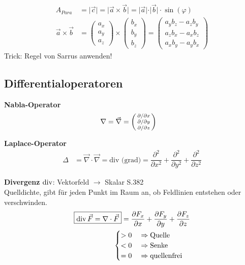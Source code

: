 \begingroup
\renewcommand*{\arraystretch}{.95}
\begin{align*}
	A_{Para} & = \vert \vec{c} \vert = \vert \vec{a} \times \vec{b} \vert = \vert \vec{a} \vert \cdot \vert \vec{b} \vert \cdot \sin(\varphi)\\
	\vec{a}\times\vec{b} & =
	\begin{pmatrix}
		a_x \\
		a_y \\
		a_z
	\end{pmatrix}
	\times
	\begin{pmatrix}
		b_x \\
		b_y \\
		b_z
	\end{pmatrix} =
	\begin{pmatrix}
		a_yb_z-a_zb_y \\
		a_zb_x-a_xb_z \\
		a_xb_y-a_yb_x
	\end{pmatrix}
\end{align*}
\endgroup
Trick: Regel von Sarrus anwenden!

\subsection{Differentialoperatoren}
\textbf{Nabla-Operator}
\begin{align*}
    \nabla & = \vec{\nabla} = 
    \begin{psmallmatrix}
        \partial  / \partial x \\
        \partial  / \partial y \\
        \partial  / \partial z
    \end{psmallmatrix}
\end{align*}

\textbf{Laplace-Operator}
\begin{align*}
    \varDelta  & = \vec{\nabla} \cdot \vec{\nabla} = \textrm{div (grad)} = 
    \dfrac{\partial ^2}{\partial x^2}+\dfrac{\partial ^2}{\partial y^2}+\dfrac{\partial ^2}{\partial z^2}
\end{align*}

\textbf{Divergenz} $\operatorname{div}$: Vektorfeld $\rightarrow$ Skalar \qquad S.382\\
\small{Quelldichte, gibt für jeden Punkt im Raum an, ob Feldlinien entstehen oder verschwinden.}
\begin{align*}
    \boxed{\operatorname{div} \vec{F} = \nabla \cdot \vec{F}}   =  \dfrac{\partial F_x}{\partial x} 
    + \dfrac{\partial F_y}{\partial y} + \dfrac{\partial F_z}{\partial z}\\ 
                                 \begin{cases}
    > 0 \quad\Rightarrow \textnormal{Quelle}  \\
    < 0 \quad\Rightarrow \textnormal{Senke} \\
    = 0 \quad\Rightarrow \textnormal{quellenfrei} 
\end{cases}                                      
\end{align*}

